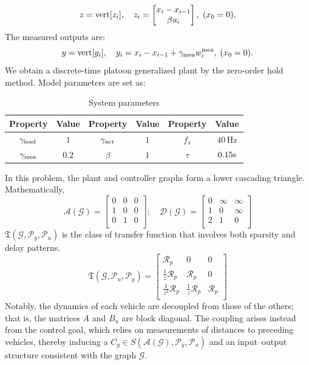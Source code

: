 \[
z ={\mathrm{vert}}[z_i],\quad z_i =  \begin{bmatrix}
    x_i - x_{i-1} \\ \beta u_i\\
\end{bmatrix},\; (x_0 = 0).
\]
The measured outputs are:
\[
y = {\mathrm{vert}}[y_i],\quad y_i = x_i - x_{i-1} + \gamma_{\mathrm{mea}} w_{i}^{\mathrm{mea}}, \; (x_0 = 0).
\]
We obtain a discrete-time platoon generalized plant by the zero-order hold method. Model parameters are set as:
\begin{table}[htbp]
    \caption{System parameters}
    \label{tab:Platoon_config}
    \centering
    \begin{tabular}{cc|cc|cc}
    \hline
    Property & Value & Property & Value & Property & Value \\
    \hline
    $\gamma_{\rm{lead}}$ & $1$ & $\gamma_{\rm{act}}$ & $1$ 
          & $f_s$ & $40\,\mathrm{Hz}$ \\
    $\gamma_{\rm{mea}}$ & $0.2$ & $\beta$ & $1$
          & $\tau$ & $0.15 \rm{s}$ \\
    \hline
    \end{tabular}
\end{table}


In this problem, the plant and controller graphs form a lower cascading triangle. Mathematically, 
\begin{equation}
\mathcal{A}(\mathcal{G}) = 
\left[
\begin{array}{ccc}
0 & 0 & 0 \\
1 & 0 & 0 \\
0 & 1 & 0 \\
\end{array}
\right];\quad 
\mathcal{D}(\mathcal{G}) = 
\left[
\begin{array}{ccc}
0 & \infty & \infty \\
1 & 0 & \infty \\
2 & 1 & 0 \\
\end{array}
\right]
\end{equation}
\(\mathfrak{T}(\mathcal{G},\mathcal{P}_y,\mathcal{P}_u)\) is the class of transfer function that involves both sparsity and delay patterns.
\begin{equation}
\mathfrak{T}(\mathcal{G},\mathcal{P}_u,\mathcal{P}_y) = 
\left[
\begin{array}{ccc}
\mathcal{R}_p & 0 & 0 \\
\frac{1}{z}\mathcal{R}_p & \mathcal{R}_p & 0 \\
\frac{1}{z^2}\mathcal{R}_p & \frac{1}{z}\mathcal{R}_p & \mathcal{R}_p \\
\end{array}
\right]
\end{equation}
Notably, the dynamics of each vehicle are decoupled from those of the others; that is, the matrices $A$ and $B_u$ are block diagonal. 
The coupling arises instead from the control goal, which relies on measurements of distances to preceding vehicles, thereby inducing a \(C_y \in S(\mathcal{A}(\mathcal{G}),\mathcal{P}_y,\mathcal{P}_x)\) and an input--output structure consistent with the graph $\mathcal{G}$.




